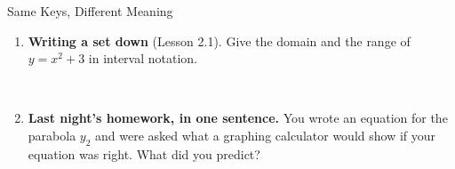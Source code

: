 \documentclass[10pt]{article}
\begin{document}
\begin{notesbox}{Same Keys, Different Meaning}
\begin{enumerate}[leftmargin=1.6em, itemsep=4pt, topsep=4pt]
\item \textbf{Writing a set down} (Lesson 2.1). Give the domain and the range of $y=x^2+3$ in
interval notation.

\ansline{Domain $(-\infty,\infty)$; range $[3,\infty)$ --- a bracket, because $3$ is reached at $x=0$.}\\

\item \textbf{Last night's homework, in one sentence.} You wrote an equation for the parabola $y_2$
and were asked what a graphing calculator would show if your equation was right. What did you
predict?

\\

\end{enumerate}
\end{notesbox}
\end{document}
